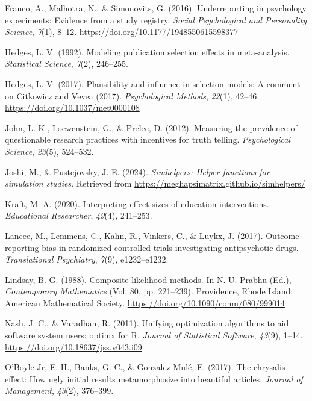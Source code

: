 \documentclass[
  american,
  man, donotrepeattitle,floatsintext]{apa7}
\newlength{\cslhangindent}
\newenvironment{CSLReferences}[2] %
 {\begin{list}{}{%
  \setlength{\itemindent}{0pt}
  \setlength{\leftmargin}{0pt}
  \setlength{\parsep}{0pt}
  \ifodd #1
   \setlength{\leftmargin}{\cslhangindent}
   \setlength{\itemindent}{-1\cslhangindent}
  \fi
  \setlength{\itemsep}{#2\baselineskip}}}
 {\end{list}}
\begin{document}
\begin{CSLReferences}{1}{0}
Franco, A., Malhotra, N., \& Simonovits, G. (2016). Underreporting in psychology experiments: Evidence from a study registry. \emph{Social Psychological and Personality Science}, \emph{7}(1), 8--12. \url{https://doi.org/10.1177/1948550615598377}

Hedges, L. V. (1992). Modeling publication selection effects in meta-analysis. \emph{Statistical Science}, \emph{7}(2), 246--255.

Hedges, L. V. (2017). Plausibility and influence in selection models: {A} comment on {Citkowicz} and {Vevea} (2017). \emph{Psychological Methods}, \emph{22}(1), 42--46. \url{https://doi.org/10.1037/met0000108}

John, L. K., Loewenstein, G., \& Prelec, D. (2012). Measuring the prevalence of questionable research practices with incentives for truth telling. \emph{Psychological Science}, \emph{23}(5), 524--532.

Joshi, M., \& Pustejovsky, J. E. (2024). \emph{Simhelpers: Helper functions for simulation studies}. Retrieved from \url{https://meghapsimatrix.github.io/simhelpers/}

Kraft, M. A. (2020). Interpreting effect sizes of education interventions. \emph{Educational Researcher}, \emph{49}(4), 241--253.

Lancee, M., Lemmens, C., Kahn, R., Vinkers, C., \& Luykx, J. (2017). Outcome reporting bias in randomized-controlled trials investigating antipsychotic drugs. \emph{Translational Psychiatry}, \emph{7}(9), e1232--e1232.

Lindsay, B. G. (1988). Composite likelihood methods. In N. U. Prabhu (Ed.), \emph{Contemporary {Mathematics}} (Vol. 80, pp. 221--239). Providence, Rhode Island: American Mathematical Society. \url{https://doi.org/10.1090/conm/080/999014}

Nash, J. C., \& Varadhan, R. (2011). Unifying optimization algorithms to aid software system users: {optimx} for {R}. \emph{Journal of Statistical Software}, \emph{43}(9), 1--14. \url{https://doi.org/10.18637/jss.v043.i09}

O'Boyle Jr, E. H., Banks, G. C., \& Gonzalez-Mulé, E. (2017). The chrysalis effect: How ugly initial results metamorphosize into beautiful articles. \emph{Journal of Management}, \emph{43}(2), 376--399.


\end{CSLReferences}
\end{document}
